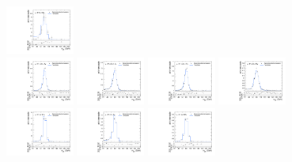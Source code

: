 \begin{figure}[htpb]
  \includegraphics[width=0.2\textwidth]{fig/2Dfit/templateVsReco_VBFGbuToWW2000_r0_MJ_mu_LP_bb_HDy.pdf}\\
  \includegraphics[width=0.2\textwidth]{fig/2Dfit/templateVsReco_VBFGbuToWW2000_r0_MJ_mu_HP_nobb_LDy.pdf}
  \includegraphics[width=0.2\textwidth]{fig/2Dfit/templateVsReco_VBFGbuToWW2000_r0_MJ_mu_LP_nobb_LDy.pdf}
  \includegraphics[width=0.2\textwidth]{fig/2Dfit/templateVsReco_VBFGbuToWW2000_r0_MJ_mu_HP_nobb_HDy.pdf}
  \includegraphics[width=0.2\textwidth]{fig/2Dfit/templateVsReco_VBFGbuToWW2000_r0_MJ_mu_LP_nobb_HDy.pdf}\\
  \includegraphics[width=0.2\textwidth]{fig/2Dfit/templateVsReco_VBFGbuToWW2000_r0_MJ_mu_HP_vbf_LDy.pdf}
  \includegraphics[width=0.2\textwidth]{fig/2Dfit/templateVsReco_VBFGbuToWW2000_r0_MJ_mu_LP_vbf_LDy.pdf}
  \includegraphics[width=0.2\textwidth]{fig/2Dfit/templateVsReco_VBFGbuToWW2000_r0_MJ_mu_HP_vbf_HDy.pdf}

\end{figure}
